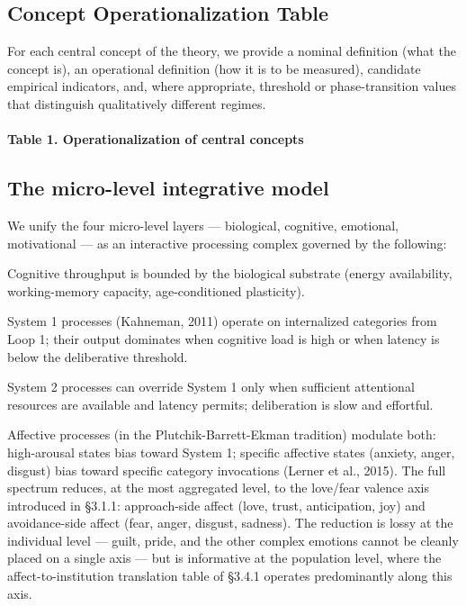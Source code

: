 \documentclass[12pt,a4paper]{article}
\begin{document}
\subsection{Concept Operationalization Table}

For each central concept of the theory, we provide a nominal definition (what the concept is), an operational definition (how it is to be measured), candidate empirical indicators, and, where appropriate, threshold or phase-transition values that distinguish qualitatively different regimes.


\paragraph{Table 1. Operationalization of central concepts}


\subsection{The micro-level integrative model}

We unify the four micro-level layers --- biological, cognitive, emotional, motivational --- as an interactive processing complex governed by the following:


Cognitive throughput is bounded by the biological substrate (energy availability, working-memory capacity, age-conditioned plasticity).

System 1 processes (Kahneman, 2011) operate on internalized categories from Loop 1; their output dominates when cognitive load is high or when latency is below the deliberative threshold.

System 2 processes can override System 1 only when sufficient attentional resources are available and latency permits; deliberation is slow and effortful.

Affective processes (in the Plutchik-Barrett-Ekman tradition) modulate both: high-arousal states bias toward System 1; specific affective states (anxiety, anger, disgust) bias toward specific category invocations (Lerner et al., 2015). The full spectrum reduces, at the most aggregated level, to the love/fear valence axis introduced in §3.1.1: approach-side affect (love, trust, anticipation, joy) and avoidance-side affect (fear, anger, disgust, sadness). The reduction is lossy at the individual level --- guilt, pride, and the other complex emotions cannot be cleanly placed on a single axis --- but is informative at the population level, where the affect-to-institution translation table of §3.4.1 operates predominantly along this axis.
\end{document}
